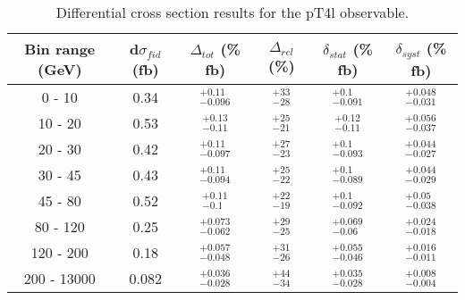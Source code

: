 \begin{table}[!h!tb]
\begin{center}
\small
\caption{
Differential cross section results for the pT4l observable.
\label{tab:pTH}
}
\begin{tabular}{|c|ccccc|} \hline \hline
Bin range (GeV) & d$\sigma_{fid}$ (fb) & $\Delta_{tot}$ (\% fb) & $\Delta_{rel}$ (\%)  & $\delta_{stat}$ (\% fb)  & $\delta_{syst}$ (\% fb) \\ \hline \hline
        0 - 10 &  0.34 &  $^{+0.11}_{-0.096}$ &  $^{+33}_{-28}$ &  $^{+0.1}_{-0.091}$ &  $^{+0.048}_{-0.031}$ \\ %
  10 - 20 &  0.53 &  $^{+0.13}_{-0.11}$ &  $^{+25}_{-21}$ &  $^{+0.12}_{-0.11}$ &  $^{+0.056}_{-0.037}$ \\ %
  20 - 30 &  0.42 &  $^{+0.11}_{-0.097}$ &  $^{+27}_{-23}$ &  $^{+0.1}_{-0.093}$ &  $^{+0.044}_{-0.027}$ \\ %
  30 - 45 &  0.43 &  $^{+0.11}_{-0.094}$ &  $^{+25}_{-22}$ &  $^{+0.1}_{-0.089}$ &  $^{+0.044}_{-0.029}$ \\ %
  45 - 80 &  0.52 &  $^{+0.11}_{-0.1}$ &  $^{+22}_{-19}$ &  $^{+0.1}_{-0.092}$ &  $^{+0.05}_{-0.038}$ \\ %
  80 - 120 &  0.25 &  $^{+0.073}_{-0.062}$ &  $^{+29}_{-25}$ &  $^{+0.069}_{-0.06}$ &  $^{+0.024}_{-0.018}$ \\ %
  120 - 200 &  0.18 &  $^{+0.057}_{-0.048}$ &  $^{+31}_{-26}$ &  $^{+0.055}_{-0.046}$ &  $^{+0.016}_{-0.011}$ \\ %
  200 - 13000 &  0.082 &  $^{+0.036}_{-0.028}$ &  $^{+44}_{-34}$ &  $^{+0.035}_{-0.028}$ &  $^{+0.008}_{-0.004}$ \\ %


\end{tabular}
\end{center}
\end{table}
